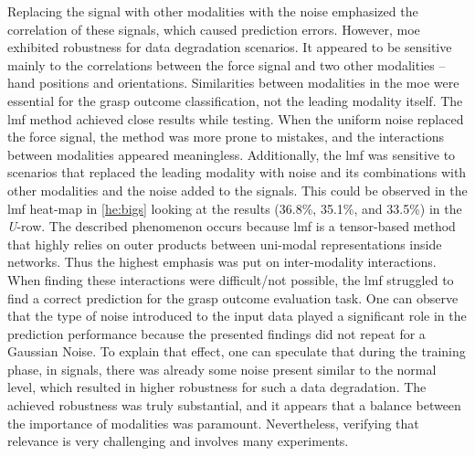 \documentclass[a4paper, 10pt, twoside]{report}
\begin{document}
Replacing the signal with other modalities with the noise emphasized the correlation of these signals, which caused prediction errors. However, \acrshort{moe} exhibited robustness for data degradation scenarios. It appeared to be sensitive mainly to the correlations between the force signal and two other modalities -- hand positions and orientations. Similarities between modalities in the \acrshort{moe} were essential for the grasp outcome classification, not the leading modality itself. The \acrshort{lmf} method achieved close results while testing. When the uniform noise replaced the force signal, the method was more prone to mistakes, and the interactions between modalities appeared meaningless. Additionally, the \acrshort{lmf} was sensitive to scenarios that replaced the leading modality with noise and its combinations with other modalities and the noise added to the signals. This could be observed in the \acrshort{lmf} heat-map in \Figure\ref{he:bigs} looking at the results (36.8\%, 35.1\%, and 33.5\%) in the \textit{U}-row. The described phenomenon occurs because \acrshort{lmf} is a tensor-based method that highly relies on outer products between uni-modal representations inside networks. Thus the highest emphasis was put on inter-modality interactions. When finding these interactions were difficult/not possible, the \acrshort{lmf} struggled to find a correct prediction for the grasp outcome evaluation task. One can observe that the type of noise introduced to the input data played a significant role in the prediction performance because the presented findings did not repeat for a Gaussian Noise. To explain that effect, one can speculate that during the training phase, in signals, there was already some noise present similar to the normal level, which resulted in higher robustness for such a data degradation. The achieved robustness was truly substantial, and it appears that a balance between the importance of modalities was paramount. Nevertheless, verifying that relevance is very challenging and involves many experiments. 
\end{document}
